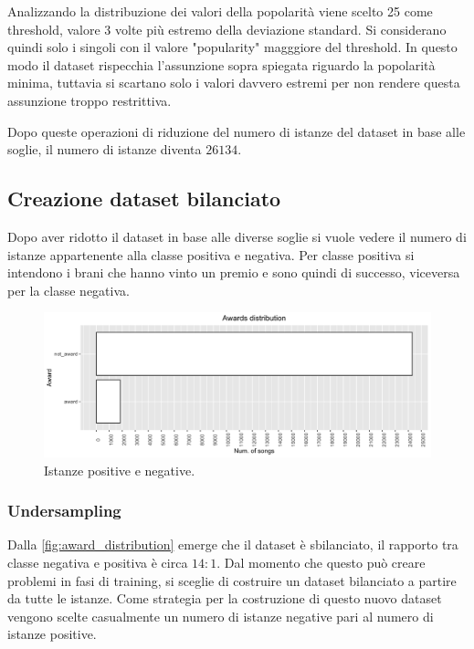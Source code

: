 Analizzando la distribuzione dei valori della popolarità viene scelto
25 come threshold, valore 3 volte più estremo della deviazione
standard. Si considerano quindi solo i singoli con il valore
"popularity" magggiore del threshold. In questo modo il dataset
rispecchia l'assunzione sopra spiegata riguardo la popolarità minima,
tuttavia si scartano solo i valori davvero estremi per non rendere
questa assunzione troppo restrittiva.

Dopo queste operazioni di riduzione del numero di istanze del dataset
in base alle soglie, il numero di istanze diventa $26134$.

\subsection{Creazione dataset bilanciato}
Dopo aver ridotto il dataset in base alle diverse soglie si vuole
vedere il numero di istanze appartenente alla classe positiva e
negativa. Per classe positiva si intendono i brani che hanno vinto un
premio e sono quindi di successo, viceversa per la classe negativa.

\begin{figure}[H]
	\centering
	\includegraphics[width=14cm]{../images/awards_distribution.png}
	\caption{Istanze positive e negative.}
	\label{fig:award_distribution}
\end{figure}

\subsubsection{Undersampling}
Dalla \autoref{fig:award_distribution} emerge che il dataset è
sbilanciato, il rapporto tra classe negativa e positiva è circa
$14:1$. Dal momento che questo può creare problemi in fasi di
training, si sceglie di costruire un dataset bilanciato a partire da
tutte le istanze. Come strategia per la costruzione di questo nuovo
dataset vengono scelte casualmente un numero di istanze negative pari
al numero di istanze positive.

